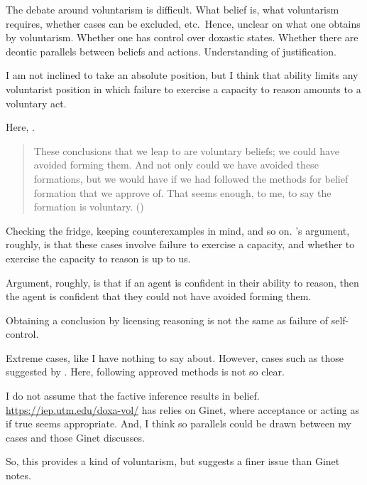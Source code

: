 \documentclass[10pt]{article}
\begin{document}
\begin{note}
  The debate around voluntarism is difficult.
  What belief is, what voluntarism requires, whether cases can be excluded, etc.\
  Hence, unclear on what one obtains by voluntarism.
  Whether one has control over doxastic states.
  Whether there are deontic parallels between beliefs and actions.
  Understanding of justification.

  I am not inclined to take an absolute position, but I think that ability limits any voluntarist position in which failure to exercise a capacity to reason amounts to a voluntary act.

  Here, \citeauthor{Weatherson:2008uq}.

  \begin{quote}
    These conclusions that we leap to are voluntary beliefs; we could have avoided forming them.
    And not only could we have avoided these formations, but we would have if we had followed the methods for belief formation that we approve of.
    That seems enough, to me, to say the formation is voluntary.\nolinebreak
    \mbox{}\hfill\mbox{(\citeyear[10]{Weatherson:2008uq})}
  \end{quote}

  Checking the fridge, keeping counterexamples in mind, and so on.
  \citeauthor{Weatherson:2008uq}'s argument, roughly, is that these cases involve failure to exercise a capacity, and whether to exercise the capacity to reason is up to us.

  Argument, roughly, is that if an agent is confident in their ability to reason, then the agent is confident that they could not have avoided forming them.

  Obtaining a conclusion by licensing reasoning is not the same as failure of self-control.


  Extreme cases, like \citeauthor{Ginet:2001aa} I have nothing to say about.
  However, cases such as those suggested by \citeauthor{Weatherson:2008uq}.
  Here, following approved methods is not so clear.
\end{note}

\begin{note}
  I do not assume that the factive inference results in belief.
  \url{https://iep.utm.edu/doxa-vol/} has relies on Ginet, where acceptance or acting as if true seems appropriate.
  And, I think so parallels could be drawn between my cases and those Ginet discusses.

  So, this provides a kind of voluntarism, but suggests a finer issue than Ginet notes.
\end{note}
\end{document}
